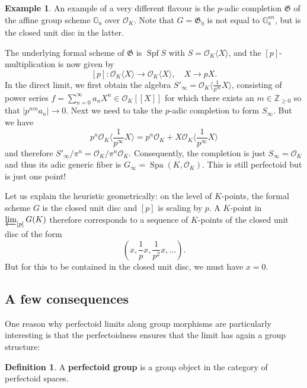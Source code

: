 \documentclass[10pt,oneside]{amsart}
\theoremstyle{definition}
\newtheorem{definition}[theorem]{Definition}
\newtheorem*{example}{Example}
\begin{document}
	
	\begin{example}
		An example of a very different flavour is  the $p$-adic completion  $\mathfrak G$  of the affine group scheme $\mathbb G_a$ over $\mathcal O_K$. Note that $G=\mathfrak G_\eta$ is not equal to $\mathbb G_a^{an}$, but is the closed unit disc in the latter.
		
		The underlying formal scheme of $\mathfrak G$ is $\operatorname {Spf} S$ with $S=\mathcal O_K\langle X \rangle$, and the $[p]$-multiplication is now given by
		\[[p]:\mathcal O_K\langle X \rangle\rightarrow  \mathcal O_K\langle X \rangle, \quad X\rightarrow pX.\]
		In the direct limit, we first obtain the algebra $S'_\infty  = \mathcal O_K\langle \frac{1}{p^\infty}X \rangle$, consisting of power series $f=\sum_{n=0}^\infty  a_nX^n\in \mathcal O_K[[X]]$ for which there exists an $m\in \mathbb Z_{\geq 0}$ so that $|p^{nm}a_n|\to 0$. Next we need to take the $p$-adic completion to form $S_\infty$. But we have 
		\[p^n\mathcal O_K\langle \frac{1}{p^\infty}X \rangle = p^n\mathcal O_K + X \mathcal O_K\langle \frac{1}{p^\infty}X \rangle\]
		and therefore $S'_\infty/\pi^n=\mathcal O_K/\pi^n\mathcal O_K$. Consequently, the completion is just $S_\infty = \mathcal O_K$ and thus its adic generic fiber is $G_\infty = \operatorname{Spa}(K,\mathcal O_K)$.  This is still perfectoid but is just one point!
		
		Let us explain the heuristic geometrically: on the level of $K$-points, the formal scheme $G$ is the closed unit disc and $[p]$ is scaling by $p$. A $K$-point in $\varprojlim_{[p]} G(K)$ therefore corresponds to a sequence of $K$-points of the closed unit disc of the form 
		$$(x,\frac{1}{p}x,\frac{1}{p^2}x,\dots).$$ But for this to be contained in the closed unit disc, we must have $x=0$. 
		
	\end{example}
	
 
 
	
 
	
		
	\subsection{A few consequences}
	
	One reason why perfectoid limits along group morphisms are particularly interesting is that the perfectoidness ensures that the limit has again a group structure:
	
	\begin{definition}
		A \textbf{perfectoid group} is a group object in the category of perfectoid spaces.
	\end{definition}
	
\end{document}
